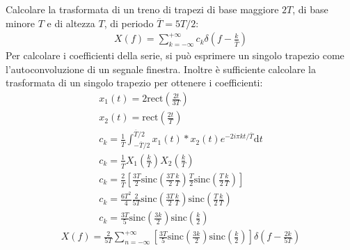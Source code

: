 \documentclass{article}
\newcommand{\rect}{\mbox{rect}}
\newcommand{\sinc}{\mbox{sinc}}
\newcommand{\df}{\mathrm{d}}
\begin{document}
Calcolare la trasformata di un treno di trapezi di base maggiore $2T$, di base minore $T$ e di altezza $T$, di periodo $\overline T=5T/2$:
\begin{gather*}
    X(f)=\displaystyle\sum_{k=-\infty}^{+\infty}c_k\delta\left(f-\frac{k}{\overline T}\right)
\end{gather*}
Per calcolare i coefficienti della serie, si può esprimere un singolo trapezio come l'autoconvoluzione di un segnale finestra. Inoltre è sufficiente calcolare la 
trasformata di un singolo trapezio per ottenere i coefficienti:
\begin{gather*}
    x_1(t)=2\displaystyle\rect\left(\frac{2t}{3T}\right)\\
    x_2(t)=\displaystyle\rect\left(\frac{2t}{T}\right)\\
    c_k=\displaystyle\frac{1}{\overline T}\int_{-\overline T/2}^{\overline T/2}x_1(t)*x_2(t)e^{-2i\pi kt/\overline T}\df t\\
    c_k=\displaystyle\frac{1}{\overline T}X_1\left(\frac{k}{ T}\right)X_2\left(\frac{k}{ T}\right)\\
    c_k=\displaystyle\frac{2}{\overline T}\left[\frac{3T}{2}\sinc\left(\frac{3T}{2}\frac{k}{ T}\right)\frac{T}{2}\sinc\left(\frac{T}{2}\frac{k}{ T}\right)\right]\\
    c_k=\displaystyle\frac{6T^2}{4}\frac{2}{5T}\sinc\left(\frac{3T}{2}\frac{k}{ T}\right)\sinc\left(\frac{T}{2}\frac{k}{ T}\right)\\
    c_k=\displaystyle\frac{3T}{5}\sinc\left(\frac{3k}{2}\right)\sinc\left(\frac{k}{2}\right)
\end{gather*}
\begin{gather}
    X(f)=\displaystyle\frac{2}{5T}\sum_{n=-\infty}^{+\infty}\left[\frac{3T}{5}\sinc\left(\frac{3k}{2}\right)\sinc\left(\frac{k}{2}\right)\right]\delta\left(f-\frac{2k}{5T}\right)
\end{gather}
\end{document}
